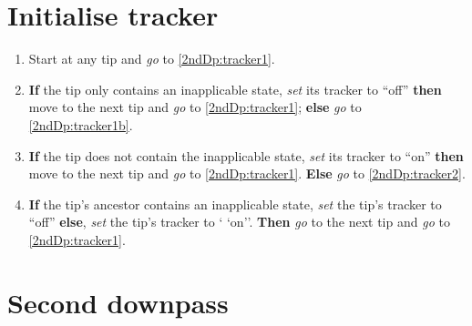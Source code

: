 \documentclass[a4paper,12pt]{article}
\begin{document}
\section{Initialise tracker}

\begin{enumerate}
    \item \label{2ndDp:tracker} Start at any tip and \textit{go} to \ref{2ndDp:tracker1}.
    \item \label{2ndDp:tracker1} \textbf{If} the tip only contains an inapplicable state, \textit{set} its tracker to ``off'' \textbf{then} move to the next tip and \textit{go} to \ref{2ndDp:tracker1}; \textbf{else} \textit{go} to \ref{2ndDp:tracker1b}.
    \item \label{2ndDp:tracker1b} \textbf{If} the tip does not contain the inapplicable state, \textit{set} its tracker to ``on'' \textbf{then} move to the next tip and \textit{go} to \ref{2ndDp:tracker1}. \textbf{Else} \textit{go} to \ref{2ndDp:tracker2}.
    \item \label{2ndDp:tracker2} \textbf{If} the tip's ancestor contains an inapplicable state, \textit{set} the tip's tracker to ``off'' \textbf{else}, \textit{set} the tip's tracker to ` `on''. \textbf{Then} \textit{go} to the next tip and \textit{go} to \ref{2ndDp:tracker1}.
\end{enumerate}

\section{Second downpass} \label{2ndDp}
\end{document}

